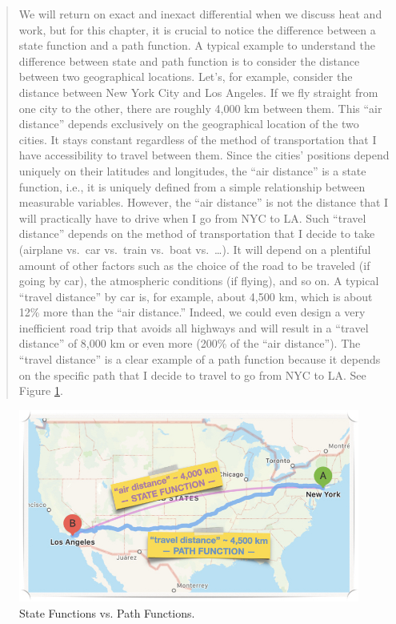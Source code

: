 \documentclass[
  9pt,
]{extbook}
\theoremstyle{definition}
\theoremstyle{definition}
\theoremstyle{definition}
\theoremstyle{remark}
\begin{document}
\begin{quote}
We will return on exact and inexact differential when we discuss heat and work, but for this chapter, it is crucial to notice the difference between a state function and a path function. A typical example to understand the difference between state and path function is to consider the distance between two geographical locations. Let's, for example, consider the distance between New York City and Los Angeles. If we fly straight from one city to the other, there are roughly 4,000 km between them. This ``air distance'' depends exclusively on the geographical location of the two cities. It stays constant regardless of the method of transportation that I have accessibility to travel between them. Since the cities' positions depend uniquely on their latitudes and longitudes, the ``air distance'' is a state function, i.e., it is uniquely defined from a simple relationship between measurable variables. However, the ``air distance'' is not the distance that I will practically have to drive when I go from NYC to LA. Such ``travel distance'' depends on the method of transportation that I decide to take (airplane vs.~car vs.~train vs.~boat vs.~\ldots). It will depend on a plentiful amount of other factors such as the choice of the road to be traveled (if going by car), the atmospheric conditions (if flying), and so on. A typical ``travel distance'' by car is, for example, about 4,500 km, which is about 12\% more than the ``air distance.'' Indeed, we could even design a very inefficient road trip that avoids all highways and will result in a ``travel distance'' of 8,000 km or even more (200\% of the ``air distance''). The ``travel distance'' is a clear example of a path function because it depends on the specific path that I decide to travel to go from NYC to LA. See Figure \ref{fig:Fig2c1}.
\end{quote}

\begin{figure}

{\centering \includegraphics[width=0.7\linewidth]{./img/OEP_Figures.002} 

}

\caption{State Functions vs. Path Functions.}\label{fig:Fig2c1}
\end{figure}
\end{document}
